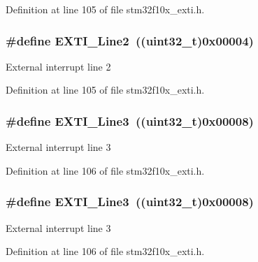 Definition at line 105 of file stm32f10x\+\_\+exti.\+h.

\subsubsection[{\texorpdfstring{E\+X\+T\+I\+\_\+\+Line2}{EXTI_Line2}}]{\setlength{\rightskip}{0pt plus 5cm}\#define E\+X\+T\+I\+\_\+\+Line2~(({\bf uint32\+\_\+t})0x00004)}\hypertarget{group___e_x_t_i___lines_gaec4189bb2709c8c15a0339d1b0b9865a}{}\label{group___e_x_t_i___lines_gaec4189bb2709c8c15a0339d1b0b9865a}
External interrupt line 2 

Definition at line 105 of file stm32f10x\+\_\+exti.\+h.

\subsubsection[{\texorpdfstring{E\+X\+T\+I\+\_\+\+Line3}{EXTI_Line3}}]{\setlength{\rightskip}{0pt plus 5cm}\#define E\+X\+T\+I\+\_\+\+Line3~(({\bf uint32\+\_\+t})0x00008)}\hypertarget{group___e_x_t_i___lines_gadea3ef6ab7e8bacc686689de8711b98c}{}\label{group___e_x_t_i___lines_gadea3ef6ab7e8bacc686689de8711b98c}
External interrupt line 3 

Definition at line 106 of file stm32f10x\+\_\+exti.\+h.

\subsubsection[{\texorpdfstring{E\+X\+T\+I\+\_\+\+Line3}{EXTI_Line3}}]{\setlength{\rightskip}{0pt plus 5cm}\#define E\+X\+T\+I\+\_\+\+Line3~(({\bf uint32\+\_\+t})0x00008)}\hypertarget{group___e_x_t_i___lines_gadea3ef6ab7e8bacc686689de8711b98c}{}\label{group___e_x_t_i___lines_gadea3ef6ab7e8bacc686689de8711b98c}
External interrupt line 3 

Definition at line 106 of file stm32f10x\+\_\+exti.\+h.

